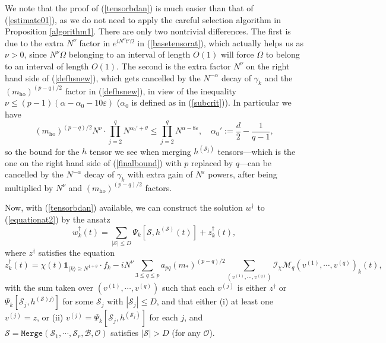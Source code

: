 \documentclass[11 pt,reqno]{amsart}
\theoremstyle{definition}
\theoremstyle{remark}
\numberwithin{equation}{section}
\newcommand{\Sc}{\mathcal{S}}
\newcommand{\Ic}{\mathcal{I}}
\renewcommand{\Mc}{\mathcal{M}}
\newcommand{\Bs}{\mathscr{B}}
\newcommand{\Os}{\mathscr{O}}
\begin{document}
{We note that the proof of (\ref{tensorbdan}) is much easier than that of (\ref{estimate01}), as we do not need to apply the careful selection algorithm in Proposition \ref{algorithm1}. There are only two nontrivial differences. The first is due to the extra $N^\nu$ factor in  $e^{iN^\nu t'\Omega}$ in (\ref{basetensorat}), which actually helps us as $\nu>0$, since $N^\nu\Omega$ belonging to an interval of length $O(1)$ will force $\Omega$ to belong to an interval of length $O(1)$. The second is the extra factor $N^\nu$ on the right hand side of (\ref{defhsnew}), which gets cancelled by the $N^{-\alpha}$ decay of $\gamma_k$ and the $(m_\mathrm{ho})^{(p-q)/2}$ factor in (\ref{defhsnew}), in view of the inequality $\nu\leq (p-1)(\alpha-\alpha_0-10\varepsilon)$ ($\alpha_0$ is defined as in (\ref{subcrit})). In particular we have
\[(m_\mathrm{ho})^{(p-q)/2}N^\nu\cdot\prod_{j=2}^q N^{\alpha_0'+\theta}\leq \prod_{j=2}^q N^{\alpha-8\varepsilon},\quad \alpha_0':=\frac{d}{2}-\frac{1}{q-1},\] so the bound for the $h$ tensor we see when merging $h^{(\Sc_j)}$ tensors---which is the one on the right hand side of (\ref{finalbound}) with $p$ replaced by $q$---can be cancelled by the $N^{-\alpha}$ decay of $\gamma_k$ with extra gain of $N^{\varepsilon}$ powers, after being multiplied by $N^\nu$ and $(m_\mathrm{ho})^{(p-q)/2}$ factors.

Now, with (\ref{tensorbdan}) available, we can construct the solution $w^\dagger$ to (\ref{equationat2}) by the ansatz 
\begin{equation}\label{ansatzwd}w_k^\dagger(t)=\sum_{|\Sc|\leq D}\Psi_k[\Sc,h^{(\Sc)}(t)]+z_k^\dagger(t),\end{equation} where $z^\dagger$ satisfies the equation
\begin{equation}\label{equationforz}z_k^\dagger(t)=\chi(t)\mathbf{1}_{\langle k\rangle\geq N^{1+\theta}}\cdot f_k-i N^\nu\sum_{3\leq q \leq p}a_{pq}(m_*)^{(p-q)/2}\sum_{(v^{(1)},\cdots,v^{(q)})}\Ic_\chi\Mc_q(v^{(1)},\cdots,v^{(q)})_k(t),
\end{equation} with the sum taken over $(v^{(1)},\cdots,v^{(q)})$ such that each $v^{(j)}$ is either $z^\dagger$ or $\Psi_k[\Sc_j,h^{(\Sc)j)}]$ for some $\Sc_j$ with $|\Sc_j|\leq D$, and that either (i) at least one $v^{(j)}=z$, or (ii) $ v^{(j)}=\Psi_k[\Sc_j,h^{(\Sc_j)}]$ for each $j$, and $\Sc=\mathtt{Merge}(\Sc_1,\cdots,\Sc_r,\Bs,\Os)$ satisfies $|\Sc|>D$ (for any $\Os$).

}
\end{document}
